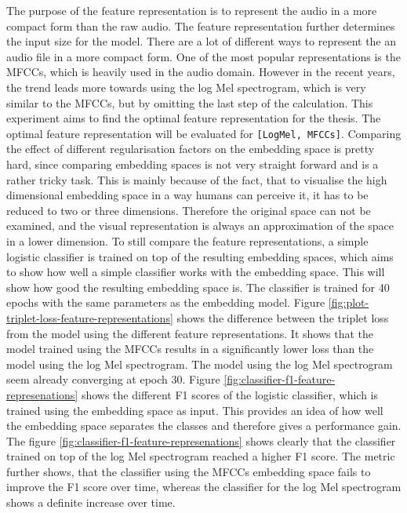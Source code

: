\noindent
The purpose of the feature representation is to represent the audio in a more compact form than the raw audio. The feature representation further determines the input size for the model. There are a lot of different ways to represent the an audio file in a more compact form. One of the most popular representations is the MFCCs, which is heavily used in the audio domain. However in the recent years, the trend leads more towards using the log Mel spectrogram, which is very similar to the MFCCs, but by omitting the last step of the calculation. This experiment aims to find the optimal feature representation for the thesis. The optimal feature representation will be evaluated for \texttt{[LogMel, MFCCs]}.
\newline
\newline
Comparing the effect of different regularisation factors on the embedding space is pretty hard, since comparing embedding spaces is not very straight forward and is a rather tricky task. This is mainly because of the fact, that to visualise the high dimensional embedding space in a way humans can perceive it, it has to be reduced to two or three dimensions. Therefore the original space can not be examined, and the visual representation is always an approximation of the space in a lower dimension. To still compare the feature representations, a simple logistic classifier is trained on top of the resulting embedding spaces, which aims to show how well a simple classifier works with the embedding space. This will show how good the resulting embedding space is. The classifier is trained for 40 epochs with the same parameters as the embedding model.
\newline
\newline
Figure \ref{fig:plot-triplet-loss-feature-representations} shows the difference between the triplet loss from the model using the different feature representations. It shows that the model trained using the MFCCs results in a significantly lower loss than the model using the log Mel spectrogram. The model using the log Mel spectrogram seem already converging at epoch 30.
\newline
\newline
Figure \ref{fig:classifier-f1-feature-represenations} shows the different F1 scores of the logistic classifier, which is trained using the embedding space as input. This provides an idea of how well the embedding space separates the classes and therefore gives a performance gain. The figure \ref{fig:classifier-f1-feature-represenations} shows clearly that the classifier trained on top of the log Mel spectrogram reached a higher F1 score. The metric further shows, that the classifier using the MFCCs embedding space fails to improve the F1 score over time, whereas the classifier for the log Mel spectrogram shows a definite increase over time.
